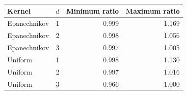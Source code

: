 \begin{tabular}{lrrr}
\toprule
Kernel & $d$ & Minimum ratio & Maximum ratio\\
\midrule
Epanechnikov & 1 & 0.999 & 1.169\\
Epanechnikov & 2 & 0.998 & 1.056\\
Epanechnikov & 3 & 0.997 & 1.005\\
Uniform & 1 & 0.998 & 1.130\\
Uniform & 2 & 0.997 & 1.016\\
Uniform & 3 & 0.966 & 1.000\\
\bottomrule
\end{tabular}
